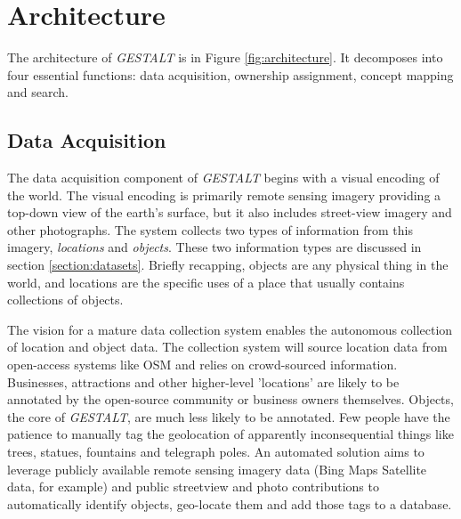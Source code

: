 \section{Architecture}
\label{section:architecture}

\begin{figure*}[t]
	\label{fig:architecture}
	
	\centering
	\caption[widht=\textwidth]{The architecture of \textit{GESTALT} consists of the data collection subsystem, the ownership assignment process, the concept mapping process and the search subsystem.}
\end{figure*}

The architecture of \textit{GESTALT} is in Figure \ref{fig:architecture}. It decomposes into four essential functions: data acquisition, ownership assignment, concept mapping and search. 

\subsection{Data Acquisition}
The data acquisition component of \textit{GESTALT} begins with a visual encoding of the world. 
The visual encoding is primarily remote sensing imagery providing a top-down view of the earth's surface, but it also includes street-view imagery and other photographs. 
The system collects two types of information from this imagery, \textit{locations} and \textit{objects}. 
These two information types are discussed in section \ref{section:datasets}. 
Briefly recapping, objects are any physical thing in the world, and locations are the specific uses of a place that usually contains collections of objects. 

The vision for a mature data collection system enables the autonomous collection of location and object data. 
The collection system will source location data from open-access systems like OSM and relies on crowd-sourced information. 
Businesses, attractions and other higher-level 'locations' are likely to be annotated by the open-source community or business owners themselves. 
Objects, the core of \textit{GESTALT}, are much less likely to be annotated. Few people have the patience to manually tag the geolocation of apparently inconsequential things like trees, statues, fountains and telegraph poles. 
An automated solution aims to leverage publicly available remote sensing imagery data (Bing Maps Satellite data, for example) and public streetview and photo contributions to automatically identify objects, geo-locate them and add those tags to a database. 

